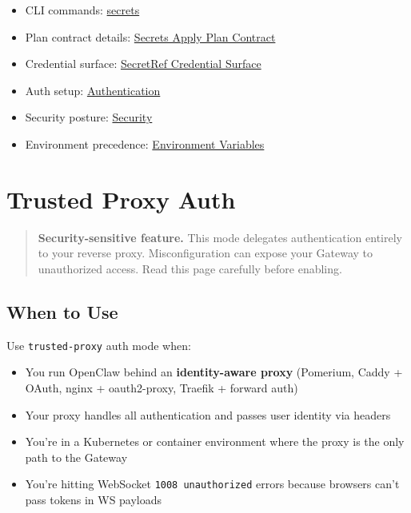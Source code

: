 \begin{itemize}
  \item CLI commands: \href{/cli/secrets}{secrets}
  \item Plan contract details: \href{/gateway/secrets-plan-contract}{Secrets Apply Plan Contract}
  \item Credential surface: \href{/reference/secretref-credential-surface}{SecretRef Credential Surface}
  \item Auth setup: \href{/gateway/authentication}{Authentication}
  \item Security posture: \href{/gateway/security}{Security}
  \item Environment precedence: \href{/help/environment}{Environment Variables}
\end{itemize}



\clearpage

\section{Trusted Proxy Auth}


\begin{quote}
 \textbf{Security-sensitive feature.} This mode delegates authentication entirely to your reverse proxy. Misconfiguration can expose your Gateway to unauthorized access. Read this page carefully before enabling.
\end{quote}


\subsection{When to Use}


Use \texttt{trusted-proxy} auth mode when:

\begin{itemize}
  \item You run OpenClaw behind an \textbf{identity-aware proxy} (Pomerium, Caddy + OAuth, nginx + oauth2-proxy, Traefik + forward auth)
  \item Your proxy handles all authentication and passes user identity via headers
  \item You're in a Kubernetes or container environment where the proxy is the only path to the Gateway
  \item You're hitting WebSocket \texttt{1008 unauthorized} errors because browsers can't pass tokens in WS payloads
\end{itemize}


